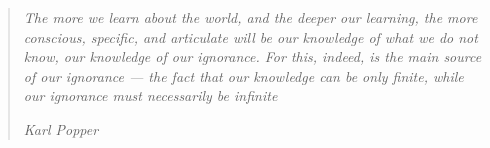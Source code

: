 \thispagestyle{empty}
\vspace*{\fill}
\begin{quote}
	\raggedleft
	\emph{The more we learn about the world, and the deeper our learning, the more conscious, specific, and articulate will be our knowledge of what we do not know, our knowledge of our ignorance. For this, indeed, is the main source of our ignorance — the fact that our knowledge can be only finite, while our ignorance must necessarily be infinite}
	
	\bigskip
	\emph{Karl Popper}
\end{quote}
\vspace*{\fill}


